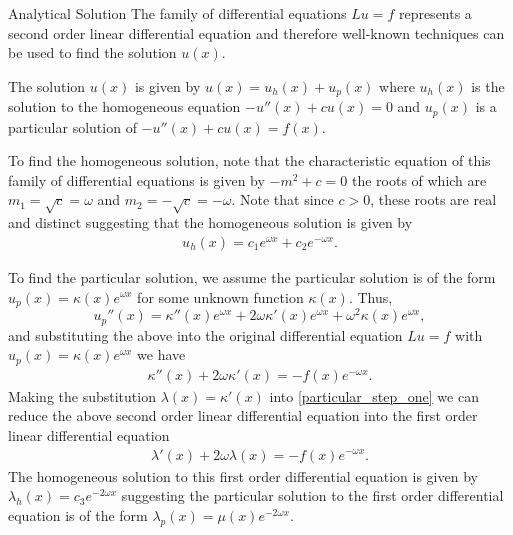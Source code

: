 \documentclass{article}
\begin{document}
\begin{section}{Analytical Solution}
  The family of differential equations $Lu = f$ represents a second order linear
  differential equation and therefore well-known techniques can be used to find
  the solution $u(x)$.

  The solution $u(x)$ is given by $u(x) = u_h(x) + u_p(x)$ where $u_h(x)$ is
  the solution to the homogeneous equation $-u''(x) + c u(x) = 0$ and $u_p(x)$
  is a particular solution of $-u''(x) + c u(x) = f(x)$.

  To find the homogeneous solution, note that the characteristic equation of
  this family of differential equations is given by $-m^2 + c = 0$ the roots of
  which are $m_1 = \sqrt{c} = \omega $ and $m_2 = -\sqrt{c} = -\omega$. Note
  that since $c > 0$, these roots are real and distinct suggesting that the
  homogeneous solution is given by
  \begin{align}\label{homogeneous_solution}
    u_h(x) = c_1 e^{\omega x} + c_2 e^{-\omega x}.
  \end{align}

  To find the particular solution, we assume the particular solution is of the
  form $u_p(x) = \kappa(x) e^{\omega x}$ for some unknown function $\kappa(x)$.
  Thus,
  \[
    u_p''(x) = \kappa''(x) e^{\omega x} + 2 \omega \kappa'(x) e^{\omega x} + \omega^2 \kappa(x) e^{\omega x},
  \]
  and substituting the above into the original differential equation $Lu = f$
  with $u_p(x) = \kappa(x) e^{\omega x}$ we have
  \begin{align}\label{particular_step_one}
    \kappa''(x) + 2\omega\kappa'(x) = -f(x)e^{-\omega x}.
  \end{align}
  Making the substitution $\lambda(x) = \kappa'(x)$ into \eqref{particular_step_one}
  we can reduce the above second order linear differential equation into the
  first order linear differential equation
  \begin{align}\label{particular_step_two}
    \lambda'(x) + 2\omega\lambda(x) = -f(x)e^{-\omega x}.
  \end{align}
  The homogeneous solution to this first order differential equation is given by
  $\lambda_h(x) = c_3 e^{-2\omega x}$ suggesting the particular solution to the
  first order differential equation is of the form $\lambda_p(x) = \mu(x) e^{-2\omega x}$.


\end{section}
\end{document}
